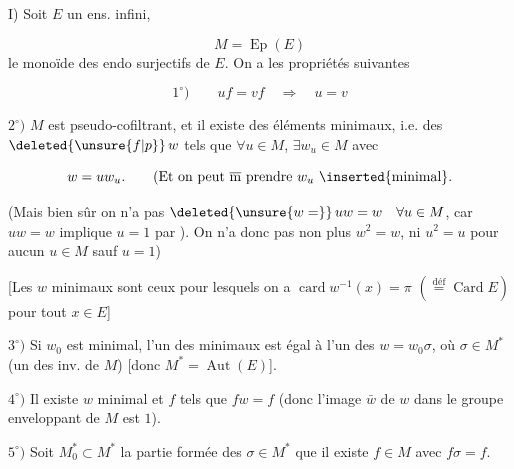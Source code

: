I) Soit $E$ un ens. infini,

\[
 M=\operatorname{Ep}(E)
\]
le monoïde des endo surjectifs de $E$. On a les propriétés suivantes

\[
 1^\circ)\qquad uf=vf\quad\Longrightarrow\quad u=v
\]

$2^\circ)$ $M$ est pseudo-cofiltrant, et  il existe des éléments minimaux, i.e. des $\deleted{\unsure{f|p}}\,w$ tels que $\forall u\in M$, $\exists w_u\in M$ avec

\[
 w=uw_u.\qquad \text{(Et on peut $\overline{\mathrm m}$ prendre $w_u$ \inserted{minimal}.}
\]

(Mais bien sûr on n'a pas $\deleted{\unsure{w=}}\,uw=w\quad\forall u\in M$, car $uw=w$ implique $u=1$ par ). On n'a donc pas non plus $w^2=w$, ni $u^2=u$ pour aucun $u\in M$ sauf $u=1$)

[Les $w$ minimaux sont ceux pour lesquels on a $\operatorname{card}w^{-1}(x)=\pi$ $(\overset{\mathrm{déf}}{=}\operatorname{Card} E)$ pour tout $x\in E$]

$3^\circ)$ Si $w_0$ est minimal, l'un des  minimaux est égal à l'un des $w=w_0\sigma$, où $\sigma\in M^*$ (un des  inv. de $M$) [donc $M^*=\operatorname{Aut}(E)$].

$4^\circ)$ Il existe $w$ minimal et $f$  tels que $fw=f$ (donc l'image $\bar w$ de $w$ dans le groupe enveloppant  de $M$ est $1$).

$5^\circ)$ Soit $M_0^*\subset M^*$  la partie formée des $\sigma\in M^*$  que il existe $f\in M$ avec $f\sigma=f$.
